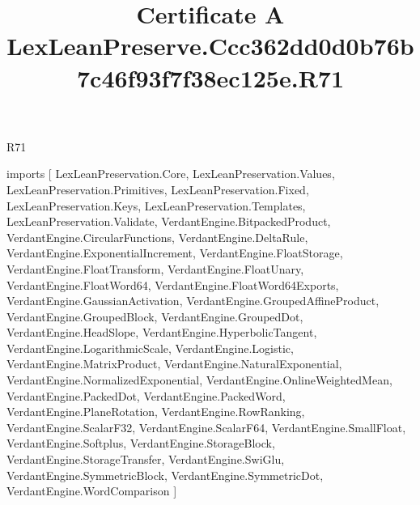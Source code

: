 \begin{lexlean}{R71}
\title{Certificate A LexLeanPreserve.Ccc362dd0d0b76b7c46f93f7f38ec125e.R71}
\begin{coremodule}
imports [
  LexLeanPreservation.Core,
  LexLeanPreservation.Values,
  LexLeanPreservation.Primitives,
  LexLeanPreservation.Fixed,
  LexLeanPreservation.Keys,
  LexLeanPreservation.Templates,
  LexLeanPreservation.Validate,
  VerdantEngine.BitpackedProduct,
  VerdantEngine.CircularFunctions,
  VerdantEngine.DeltaRule,
  VerdantEngine.ExponentialIncrement,
  VerdantEngine.FloatStorage,
  VerdantEngine.FloatTransform,
  VerdantEngine.FloatUnary,
  VerdantEngine.FloatWord64,
  VerdantEngine.FloatWord64Exports,
  VerdantEngine.GaussianActivation,
  VerdantEngine.GroupedAffineProduct,
  VerdantEngine.GroupedBlock,
  VerdantEngine.GroupedDot,
  VerdantEngine.HeadSlope,
  VerdantEngine.HyperbolicTangent,
  VerdantEngine.LogarithmicScale,
  VerdantEngine.Logistic,
  VerdantEngine.MatrixProduct,
  VerdantEngine.NaturalExponential,
  VerdantEngine.NormalizedExponential,
  VerdantEngine.OnlineWeightedMean,
  VerdantEngine.PackedDot,
  VerdantEngine.PackedWord,
  VerdantEngine.PlaneRotation,
  VerdantEngine.RowRanking,
  VerdantEngine.ScalarF32,
  VerdantEngine.ScalarF64,
  VerdantEngine.SmallFloat,
  VerdantEngine.Softplus,
  VerdantEngine.StorageBlock,
  VerdantEngine.StorageTransfer,
  VerdantEngine.SwiGlu,
  VerdantEngine.SymmetricBlock,
  VerdantEngine.SymmetricDot,
  VerdantEngine.WordComparison
]


\end{coremodule}
\end{lexlean}
